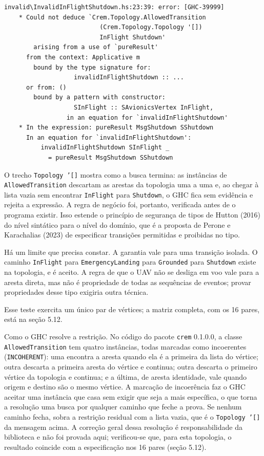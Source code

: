 \documentclass[12pt,a4paper]{article}
\begin{document}
\begin{verbatim}
invalid\InvalidInFlightShutdown.hs:23:39: error: [GHC-39999]
    * Could not deduce `Crem.Topology.AllowedTransition
                          (Crem.Topology.Topology '[])
                          InFlight Shutdown'
        arising from a use of `pureResult'
      from the context: Applicative m
        bound by the type signature for:
                   invalidInFlightShutdown :: ...
      or from: ()
        bound by a pattern with constructor:
                   SInFlight :: SAvionicsVertex InFlight,
                 in an equation for `invalidInFlightShutdown'
    * In the expression: pureResult MsgShutdown SShutdown
      In an equation for `invalidInFlightShutdown':
          invalidInFlightShutdown SInFlight _
            = pureResult MsgShutdown SShutdown
\end{verbatim}

O trecho \texttt{Topology '[]} mostra como a busca termina: as instâncias de \texttt{AllowedTransition} descartam as arestas da topologia uma a uma e, ao chegar à lista vazia sem encontrar \texttt{InFlight} para \texttt{Shutdown}, o GHC fica sem evidência e rejeita a expressão. A regra de negócio foi, portanto, verificada antes de o programa existir. Isso estende o princípio de segurança de tipos de Hutton (2016) do nível sintático para o nível do domínio, que é a proposta de Perone e Karachalias (2023) de especificar transições permitidas e proibidas no tipo.

Há um limite que precisa constar. A garantia vale para uma transição isolada. O caminho \texttt{InFlight} para \texttt{EmergencyLanding} para \texttt{Grounded} para \texttt{Shutdown} existe na topologia, e é aceito. A regra de que o UAV não se desliga em voo vale para a aresta direta, mas não é propriedade de todas as sequências de eventos; provar propriedades desse tipo exigiria outra técnica.

Esse teste exercita um único par de vértices; a matriz completa, com os 16 pares, está na seção 5.12.

Como o GHC resolve a restrição. No código do pacote \texttt{crem} 0.1.0.0, a classe \texttt{AllowedTransition} tem quatro instâncias, todas marcadas como incoerentes (\texttt{INCOHERENT}): uma encontra a aresta quando ela é a primeira da lista do vértice; outra descarta a primeira aresta do vértice e continua; outra descarta o primeiro vértice da topologia e continua; e a última, de aresta identidade, vale quando origem e destino são o mesmo vértice. A marcação de incoerência faz o GHC aceitar uma instância que casa sem exigir que seja a mais específica, o que torna a resolução uma busca por qualquer caminho que feche a prova. Se nenhum caminho fecha, sobra a restrição residual com a lista vazia, que é o \texttt{Topology '[]} da mensagem acima. A correção geral dessa resolução é responsabilidade da biblioteca e não foi provada aqui; verificou-se que, para esta topologia, o resultado coincide com a especificação nos 16 pares (seção 5.12).
\end{document}

